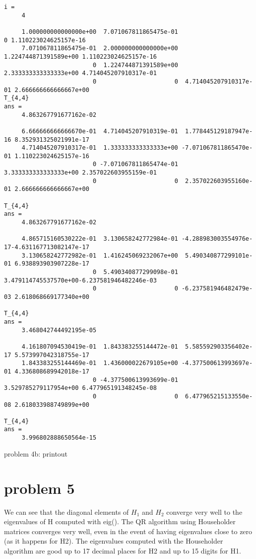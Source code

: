 \documentclass[10pt]{article}
\begin{document}
\begin{program}
 \begin{verbatim}
i =
     4

     1.000000000000000e+00  7.071067811865475e-01                      0 1.110223024625157e-16
     7.071067811865475e-01  2.000000000000000e+00  1.224744871391589e+00 1.110223024625157e-16
                         0  1.224744871391589e+00  2.333333333333333e+00 4.714045207910317e-01
                         0                      0  4.714045207910317e-01 2.666666666666667e+00
T_{4,4}
ans =
     4.863267791677162e-02

     6.666666666666670e-01  4.714045207910319e-01  1.778445129187947e-16 8.352931325021991e-17
     4.714045207910317e-01  1.333333333333333e+00 -7.071067811865470e-01 1.110223024625157e-16
                         0 -7.071067811865474e-01  3.333333333333333e+00 2.357022603955159e-01
                         0                      0  2.357022603955160e-01 2.666666666666667e+00

T_{4,4}
ans =
     4.863267791677162e-02

     4.865715160530222e-01  3.130658242772984e-01 -4.288983003554976e-17-4.631167713082147e-17
     3.130658242772982e-01  1.416245069232067e+00  5.490340877299101e-01 6.938893903907228e-17
                         0  5.490340877299098e-01  3.479114745537570e+00-6.237581946482246e-03
                         0                      0 -6.237581946482479e-03 2.618068669177340e+00

T_{4,4}
ans =
     3.468042744492195e-05

     4.161807094530419e-01  1.843383255144472e-01  5.585592903356402e-17 5.573997042318755e-17
     1.843383255144469e-01  1.436000022679105e+00 -4.377500613993697e-01 4.336808689942018e-17
                         0 -4.377500613993699e-01  3.529785279117954e+00 6.477965191348245e-08
                         0                      0  6.477965215133550e-08 2.618033988749899e+00

T_{4,4}
ans =
     3.996802888650564e-15
  \end{verbatim}
\caption{problem 4b: printout}
\end{program}

\section{problem 5}

We can see that the diagonal elements of $H_1$ and $H_2$ converge very well to 
the eigenvalues of H computed with eig(). 
The QR algorithm using Householder matrices converges very well, even in the
event of having eigenvalues close to zero (as it happens for H2). 
The eigenvalues computed with the Householder algorithm are good up to 
17 decimal places for H2 and up to 15 digits for H1. 
\end{document}
